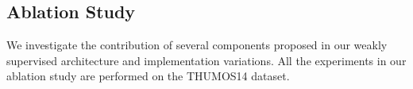 \documentclass[10pt,twocolumn,letterpaper]{article}
\begin{document}
\begin{table}[t]
\captionsetup{font=small}
\centering
\caption{Results on the ActivityNet1.3 testing set. The entries with an asterisk (*) are from the ActivityNet Challenge submissions.}
\label{table:comparison_activitynet_test}
\vspace{-0.2cm}
\small
{}
\end{table}


\subsection{Ablation Study}
\label{sub:ablation}
We investigate the contribution of several components proposed in our weakly supervised architecture and implementation variations.
All the experiments in our ablation study are performed on the THUMOS14 dataset.
\end{document}

